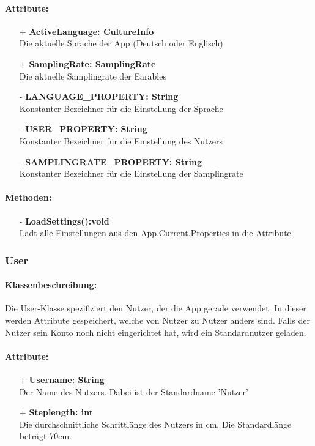 \documentclass[a4paper,12pt]{article}
\begin{document}
	\paragraph{Attribute:}
	\begin{itemize}
		\item[+] \textbf{ActiveLanguage: CultureInfo}\\Die aktuelle Sprache der App (Deutsch oder Englisch)\\
		\item[+] \textbf{SamplingRate: SamplingRate}\\Die aktuelle Samplingrate der \Gls{Earables} \\ 
		\item[-] \textbf{LANGUAGE\_PROPERTY: String}\\Konstanter Bezeichner für die Einstellung der Sprache \\
		\item[-] \textbf{USER\_PROPERTY: String}\\Konstanter Bezeichner für die Einstellung des Nutzers \\
		\item[-] \textbf{SAMPLINGRATE\_PROPERTY: String}\\Konstanter Bezeichner für die Einstellung der Samplingrate \\
	\end{itemize}
	\paragraph{Methoden:}
	\begin{itemize}
		\item[-] \textbf{LoadSettings():void}\\Lädt alle Einstellungen aus den App.Current.Properties in die Attribute.	
	\end{itemize}
\subsubsection{User}
	\paragraph{Klassenbeschreibung:}
	Die User-Klasse spezifiziert den Nutzer, der die App gerade verwendet. In dieser werden Attribute gespeichert, welche von Nutzer zu Nutzer anders sind. Falls der Nutzer sein Konto noch nicht eingerichtet hat, wird ein Standardnutzer geladen.\\
	\paragraph{Attribute:}
	\begin{itemize}
		\item[+] \textbf{Username: String}\\Der Name des Nutzers. Dabei ist der Standardname 'Nutzer'\\
		\item[+] \textbf{Steplength: int}\\Die durchschnittliche Schrittlänge des Nutzers in cm. Die Standardlänge beträgt 70cm.\\
	\end{itemize}
\end{document}
